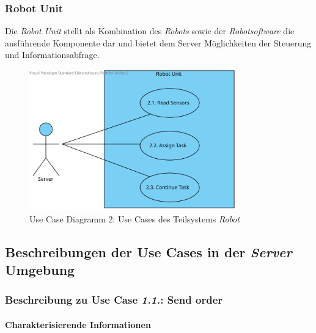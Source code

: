 			\subsubsection{Robot Unit}
			Die \emph{Robot Unit} stellt als Kombination des \emph{Robots} sowie der \emph{Robotsoftware} die ausführende Komponente dar und bietet dem Server Möglichkeiten der Steuerung und Informationsabfrage.
				\begin{figure}[H]
					\centering
					\includegraphics[width=0.8\textwidth]{img/2-Analyse-RobotUnit}
					\caption{Use Case Diagramm 2: Use Cases des Teilsystems \emph{Robot}}
					\label{fig:3-1-use-cases-robot-unit}
				\end{figure}

		\pagebreak

		\subsection{Beschreibungen der Use Cases in der \emph{Server} Umgebung}
			\subsubsection{Beschreibung zu Use Case \emph{1.1.}: Send order}	
			\paragraph*{Charakterisierende Informationen}
			
